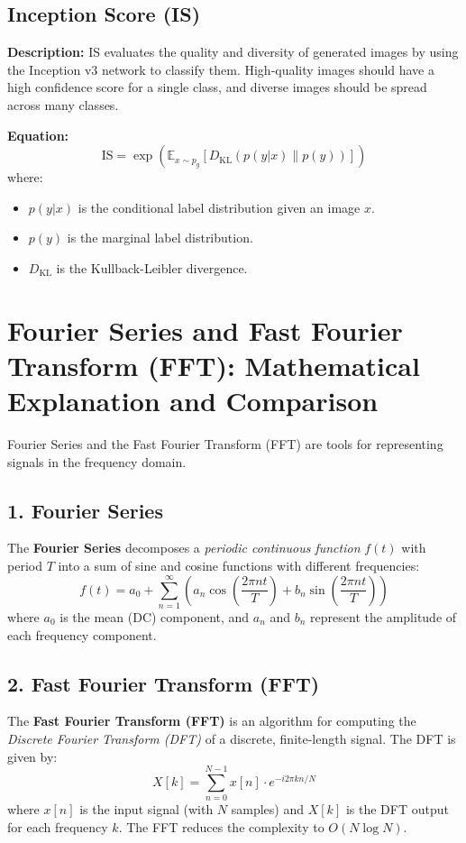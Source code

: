 \documentclass{article}
\begin{document}
\subsection{Inception Score (IS)}
\textbf{Description:} IS evaluates the quality and diversity of generated images by using the Inception v3 network to classify them. High-quality images should have a high confidence score for a single class, and diverse images should be spread across many classes.

\textbf{Equation:}
\[
\text{IS} = \exp \left( \mathbb{E}_{x \sim p_g} \left[ D_{\text{KL}}(p(y|x) \| p(y)) \right] \right)
\]
where:
\begin{itemize}
    \item \(p(y|x)\) is the conditional label distribution given an image \(x\).
    \item \(p(y)\) is the marginal label distribution.
    \item \(D_{\text{KL}}\) is the Kullback-Leibler divergence.
  \end{itemize}

\section{Fourier Series and Fast Fourier Transform (FFT): Mathematical Explanation and Comparison}

Fourier Series and the Fast Fourier Transform (FFT) are tools for representing signals in the frequency domain.

\subsection{1. Fourier Series}

The \textbf{Fourier Series} decomposes a \textit{periodic continuous function} \( f(t) \) with period \( T \) into a sum of sine and cosine functions with different frequencies:
\[
f(t) = a_0 + \sum_{n=1}^{\infty} \left( a_n \cos\left(\frac{2 \pi n t}{T}\right) + b_n \sin\left(\frac{2 \pi n t}{T}\right) \right)
\]
where \( a_0 \) is the mean (DC) component, and \( a_n \) and \( b_n \) represent the amplitude of each frequency component.

\subsection{2. Fast Fourier Transform (FFT)}

The \textbf{Fast Fourier Transform (FFT)} is an algorithm for computing the \textit{Discrete Fourier Transform (DFT)} of a discrete, finite-length signal. The DFT is given by:
\[
X[k] = \sum_{n=0}^{N-1} x[n] \cdot e^{-i 2 \pi k n / N}
\]
where \( x[n] \) is the input signal (with \( N \) samples) and \( X[k] \) is the DFT output for each frequency \( k \). The FFT reduces the complexity to \( O(N \log N) \).
\end{document}
